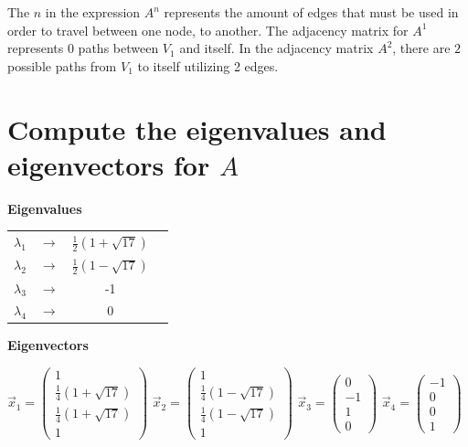 \documentclass[12pt]{scrreprt}
\begin{document}
The $n$ in the expression $A^n$ represents the amount of edges that must be used in order to travel between one  node, to another.
The adjacency matrix for $A^1$ represents $0$ paths between $V_1$ and itself. In the adjacency matrix $A^2$, there are
$2$ possible paths from $V_1$ to itself utilizing 2 edges.

\section{Compute the eigenvalues and eigenvectors for $A$}

  \begin{center}
  \textbf{Eigenvalues}
  \end{center}

  \begin{center}
  \begin{tabular}{ c c c p{5cm} }
    $\lambda_1$ & $\rightarrow$ & $\frac{1}{2}(1+\sqrt{17})$ \\        
    $\lambda_2$ & $\rightarrow$ & $\frac{1}{2}(1-\sqrt{17})$ \\
    $\lambda_3$ & $\rightarrow$ & -1 \\
    $\lambda_4$ & $\rightarrow$ & 0 \\
  \end{tabular}
  \end{center}

  \begin{center}
  \textbf{Eigenvectors}
  \end{center}

  \begin{center}
  $\vec{x}_1 = \begin{pmatrix}1\\\frac{1}{4}(1 + \sqrt{17})\\\frac{1}{4}(1 + \sqrt{17})\\1\end{pmatrix}$
  $\vec{x}_2 = \begin{pmatrix}1\\\frac{1}{4}(1 - \sqrt{17})\\\frac{1}{4}(1 - \sqrt{17})\\1\end{pmatrix}$
  $\vec{x}_3 = \begin{pmatrix}0\\-1\\1\\0\end{pmatrix}$
  $\vec{x}_4 = \begin{pmatrix}-1\\0\\0\\1\end{pmatrix}$
  \end{center}
\end{document}
